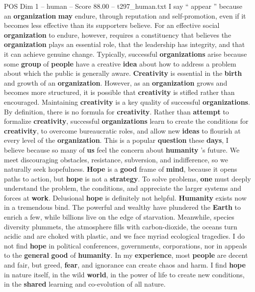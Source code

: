 \begin{textsample}{POS Dim 1 – human – Score 88.00 – t297\_human.txt}
I say “ appear ” because an \textbf{organization} \textbf{may} endure, through reputation and self-promotion, even if it becomes less effective than its supporters believe.
For an effective social \textbf{organization} to endure, however, requires a constituency that believes the \textbf{organization} plays an essential role, that the leadership has integrity, and that it can achieve genuine change.
Typically, successful \textbf{organizations} arise because some \textbf{group} of \textbf{people} have a creative \textbf{idea} about how to address a problem about which the public is generally aware. \textbf{Creativity} is essential in the \textbf{birth} and growth of an \textbf{organization}.
However, as an \textbf{organization} grows and becomes more structured, it is possible that \textbf{creativity} is stifled rather than encouraged.
Maintaining \textbf{creativity} is a key quality of successful \textbf{organizations}.
By definition, there is no formula for \textbf{creativity}.
Rather than \textbf{attempt} to formalize \textbf{creativity}, successful \textbf{organizations} learn to create the conditions for \textbf{creativity}, to overcome bureaucratic roles, and allow new \textbf{ideas} to flourish at every level of the \textbf{organization}.
This is a popular \textbf{question} these \textbf{days}, I believe because so many of \textbf{us} feel the concern about \textbf{humanity} ’s future.
We meet discouraging obstacles, resistance, subversion, and indifference, so we naturally seek hopefulness. \textbf{Hope} is a \textbf{good} frame of \textbf{mind}, because it opens paths to action, but \textbf{hope} is not a \textbf{strategy}.
To solve problems, \textbf{one} must deeply understand the problem, the conditions, and appreciate the larger systems and forces at \textbf{work}.
Delusional \textbf{hope} is definitely not helpful. \textbf{Humanity} exists now in a tremendous bind.
The powerful and wealthy have plundered the \textbf{Earth} to enrich a few, while billions live on the edge of starvation.
Meanwhile, species diversity plummets, the atmosphere fills with carbon-dioxide, the oceans turn acidic and are choked with plastic, and we face myriad ecological tragedies.
I do not find \textbf{hope} in political conferences, governments, corporations, nor in appeals to the \textbf{general} \textbf{good} of \textbf{humanity}.
In my \textbf{experience}, most \textbf{people} are decent and fair, but greed, \textbf{fear}, and ignorance can create chaos and harm.
I find \textbf{hope} in nature itself, in the wild \textbf{world}, in the power of life to create new conditions, in the \textbf{shared} learning and co-evolution of all nature.

\end{textsample}
